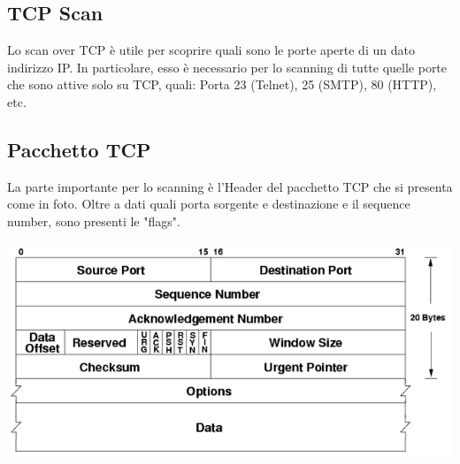\subsection{TCP Scan}
Lo scan over TCP è utile per scoprire quali sono le porte aperte di un dato indirizzo IP. In particolare, esso è necessario per lo scanning di tutte quelle porte che sono attive solo su TCP, quali: Porta 23 (Telnet), 25 (SMTP), 80 (HTTP), etc. 

\subsection{Pacchetto TCP}
La parte importante per lo scanning è l'Header del pacchetto TCP che si presenta come in foto. Oltre a dati quali porta sorgente e destinazione e il sequence number, sono presenti le "flags".

\includegraphics[scale=0.6]{UNINA_MSc_Thesis_Project/img/TCP_header.png}

